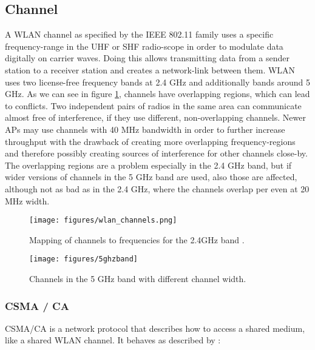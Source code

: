   \subsection{Channel}
    A \ac{WLAN} channel as specified by the IEEE 802.11 family uses a specific frequency-range in the \ac{UHF} or \ac{SHF} radio-scope in order 
    to modulate data digitally on carrier waves.
    Doing this allows transmitting data from a sender station to a receiver station and creates a network-link between them.
    \ac{WLAN} uses two license-free frequency bands at 2.4 GHz and additionally bands around 5 GHz.
    As we can see in figure \ref{fig:wlan_channels}, channels have overlapping regions, which can lead to conflicts.
    Two independent pairs of radios in the same area can communicate almost free of interference, if they use different, non-overlapping channels.
    Newer APs may use channels with 40 MHz bandwidth in order to further increase throughput with the drawback of creating more overlapping frequency-regions
    and therefore possibly creating sources of interference for other channels close-by.
    The overlapping regions are a problem especially in the 2.4 GHz band, but if wider versions of channels in the 5 GHz band are used, also those are affected,
    although not as bad as in the 2.4 GHz, where the channels overlap per even at 20 MHz width.
    
    \begin{figure}[bh!]
      \centering
      \texttt{[image: figures/wlan\_channels.png]}
      \caption{Mapping of channels to frequencies for the 2.4GHz band \cite{wlan_channels}.}
      \label{fig:wlan_channels}
    \end{figure}
    
    \begin{figure}[bh!]
      \centering
      \texttt{[image: figures/5ghzband]}
      \caption{Channels in the 5 GHz band with different channel width.}
      \label{fig:5ghzband}
    \end{figure}
    
      \subsubsection{CSMA / CA}
	\ac{CSMA/CA} is a network protocol that describes how to access a shared medium, like a shared \ac{WLAN} channel.
	It behaves as described by \cite{csma_techo}:
	
